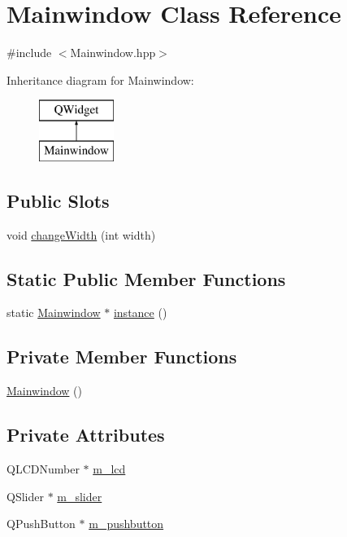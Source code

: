\hypertarget{class_mainwindow}{}\section{Mainwindow Class Reference}
\label{class_mainwindow}


{\ttfamily \#include $<$Mainwindow.\+hpp$>$}

Inheritance diagram for Mainwindow\+:\begin{figure}[H]
\begin{center}
\leavevmode
\includegraphics[height=2.000000cm]{class_mainwindow}
\end{center}
\end{figure}
\subsection*{Public Slots}
\begin{DoxyCompactItemize}
\item 
void \hyperlink{class_mainwindow_ab3176d338d0345c6e777dab74b742a33}{change\+Width} (int width)
\end{DoxyCompactItemize}
\subsection*{Static Public Member Functions}
\begin{DoxyCompactItemize}
\item 
static \hyperlink{class_mainwindow}{Mainwindow} $\ast$ \hyperlink{class_mainwindow_aedafe213d761a416bae8ccaffa6410b0}{instance} ()
\end{DoxyCompactItemize}
\subsection*{Private Member Functions}
\begin{DoxyCompactItemize}
\item 
\hyperlink{class_mainwindow_a9ca049b84f17c87a57b53e418b1c40e3}{Mainwindow} ()
\end{DoxyCompactItemize}
\subsection*{Private Attributes}
\begin{DoxyCompactItemize}
\item 
Q\+L\+C\+D\+Number $\ast$ \hyperlink{class_mainwindow_abd18cf97d805d3ea3c9d00937078b4f4}{m\+\_\+lcd}
\item 
Q\+Slider $\ast$ \hyperlink{class_mainwindow_af706665f6371f479b89bc5cd722191df}{m\+\_\+slider}
\item 
Q\+Push\+Button $\ast$ \hyperlink{class_mainwindow_a64a43df893109c11db9482ba2d7646dc}{m\+\_\+pushbutton}
\end{DoxyCompactItemize}
